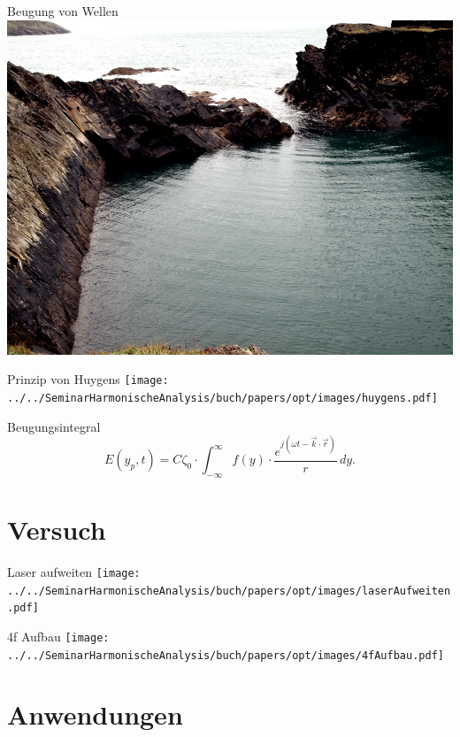 \documentclass{beamer}
\begin{document}
\begin{frame}{Beugung von Wellen}
    \centering
    \includegraphics[width=0.9\linewidth]{images/beugung_von_wasserwellen.png}
\end{frame}

\begin{frame}{Prinzip von Huygens}
    \texttt{[image: ../../SeminarHarmonischeAnalysis/buch/papers/opt/images/huygens.pdf]}
\end{frame}

\begin{frame}{Beugungsintegral}
    \begin{equation*}
        E(y_p, t)
        =
        C\zeta_0 \cdot \int_{-\infty}^{\infty}f(y)\cdot\frac{e^{j(\omega t - \vec{k}\cdot\vec{r})}}{r} \,dy
        .
    \end{equation*}
\end{frame}

\section{Versuch}

\begin{frame}{Laser aufweiten}
    \centering
    \texttt{[image: ../../SeminarHarmonischeAnalysis/buch/papers/opt/images/laserAufweiten.pdf]}
\end{frame}

\begin{frame}{4f Aufbau}
    \texttt{[image: ../../SeminarHarmonischeAnalysis/buch/papers/opt/images/4fAufbau.pdf]}
\end{frame}

\section{Anwendungen}
\end{document}
